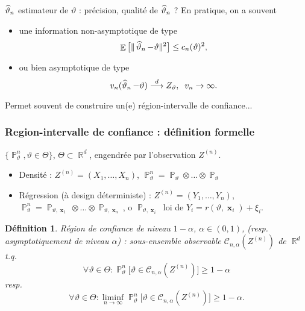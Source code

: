 \documentclass{beamer}
\newtheorem{df}{Définition}
\DeclareMathOperator{\E}{{\mathbb E}}
\DeclareMathOperator{\R}{{\mathbb R}}
\DeclareMathOperator{\PP}{{\mathbb P}}
\DeclareMathOperator{\bx}{\boldsymbol{x}}
\DeclareMathOperator{\est}{\widehat \vartheta_{\mathnormal{n}}}
\begin{document}

\begin{frame}
$\est$ estimateur de $\vartheta$ : \alert{précision, qualité} de  $\est$ ? En pratique, on a \og souvent \fg{}
\begin{itemize}
\item une information \alert{ non-asymptotique} de type
$$\E\big[\|\est-\vartheta\|^2\big] \leq c_n(\vartheta)^2,$$
\item ou bien \alert{ asymptotique} de type
$$v_n(\est-\vartheta) \stackrel{d}{\longrightarrow} Z_\vartheta,\;\;v_n\rightarrow \infty.$$
\end{itemize}
Permet \og souvent\fg{} de construire un(e) région-intervalle de confiance...
\end{frame}

\begin{frame}
\frametitle{Region-intervalle de confiance : définition formelle}
$\{\PP_\vartheta^n, \vartheta \in \Theta\}$, $\Theta \subset \R^d$, engendrée par l'observation $Z^{(n)}$.
\begin{itemize}
\item \alert{Densité} : $Z^{(n)}=(X_1,\ldots, X_n)$, $\PP_\vartheta^n=\PP_\vartheta \otimes \ldots \otimes \PP_\vartheta$
\item \alert{Régression} (à design déterministe) : $Z^{(n)} = (Y_1,\ldots, Y_n)$, $\PP_\vartheta^n = \PP_{\vartheta,{\bx_1}} \otimes \ldots \otimes \PP_{\vartheta,\bx_n}$, o $\PP_{\vartheta,\bx_i}$ loi de $Y_i = r(\vartheta,\bx_i)+\xi_i$.
\end{itemize}
\begin{df}
\alert{Région de confiance} de niveau $1-\alpha$, $\alpha \in (0,1)$, (resp. asymptotiquement de niveau $\alpha$) : sous-ensemble \alert{observable} ${\mathcal C}_{n,\alpha}(Z^{(n)})$ de $\R^d$ t.q.
$$\forall \vartheta \in \Theta : \PP_\vartheta^n\big[\vartheta \in {\mathcal C}_{n,\alpha}(Z^{(n)})\big] \geq 1-\alpha$$
resp.
$$\forall \vartheta \in \Theta : \liminf_{n \rightarrow \infty}  \PP_\vartheta^n\big[\vartheta \in {\mathcal C}_{n,\alpha}(Z^{(n)})\big] \geq 1-\alpha.$$
\end{df}
\end{frame}
\end{document}
